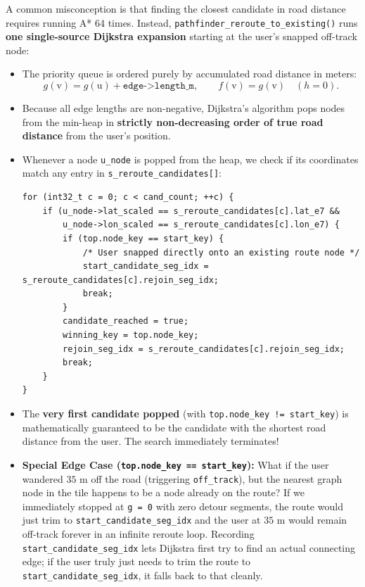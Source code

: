\documentclass[11pt,a4paper]{article}
\begin{document}
A common misconception is that finding the closest candidate in road distance requires running A* 64 times. Instead, \texttt{pathfinder\_reroute\_to\_existing()} runs \textbf{one single-source Dijkstra expansion} starting at the user's snapped off-track node:
\begin{itemize}
    \item The priority queue is ordered purely by accumulated road distance in meters:
    \[
        g(\text{v}) = g(\text{u}) + \texttt{edge->length\_m}, \qquad f(\text{v}) = g(\text{v}) \quad (h = 0).
    \]
    \item Because all edge lengths are non-negative, Dijkstra's algorithm pops nodes from the min-heap in \textbf{strictly non-decreasing order of true road distance} from the user's position.
    \item Whenever a node \texttt{u\_node} is popped from the heap, we check if its coordinates match any entry in \texttt{s\_reroute\_candidates[]}:
    \begin{lstlisting}[caption={Checking popped nodes against the candidate list}]
for (int32_t c = 0; c < cand_count; ++c) {
    if (u_node->lat_scaled == s_reroute_candidates[c].lat_e7 &&
        u_node->lon_scaled == s_reroute_candidates[c].lon_e7) {
        if (top.node_key == start_key) {
            /* User snapped directly onto an existing route node */
            start_candidate_seg_idx = s_reroute_candidates[c].rejoin_seg_idx;
            break;
        }
        candidate_reached = true;
        winning_key = top.node_key;
        rejoin_seg_idx = s_reroute_candidates[c].rejoin_seg_idx;
        break;
    }
}
    \end{lstlisting}
    \item The \textbf{very first candidate popped} (with \texttt{top.node\_key != start\_key}) is mathematically guaranteed to be the candidate with the shortest road distance from the user. The search immediately terminates!
    \item \textbf{Special Edge Case (\texttt{top.node\_key == start\_key}):} What if the user wandered $35\text{ m}$ off the road (triggering \texttt{off\_track}), but the nearest graph node in the tile happens to be a node already on the route? If we immediately stopped at \texttt{g = 0} with zero detour segments, the route would just trim to \texttt{start\_candidate\_seg\_idx} and the user at $35\text{ m}$ would remain off-track forever in an infinite reroute loop. Recording \texttt{start\_candidate\_seg\_idx} lets Dijkstra first try to find an actual connecting edge; if the user truly just needs to trim the route to \texttt{start\_candidate\_seg\_idx}, it falls back to that cleanly.
\end{itemize}
\end{document}
